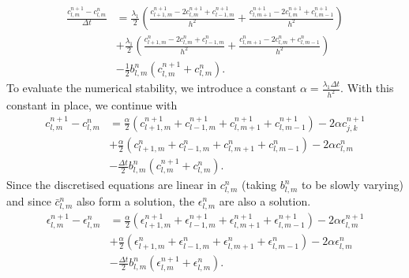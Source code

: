 \begin{equation*}
    \begin{split}
        \frac{c_{l,m}^{n+1} - c_{l,m}^{n}}{\Delta t} &=
        \frac{\lambda_1}{2}  \left( \frac{c_{l+1,m}^{n+1} - 2 c_{l,m}^{n+1} + c_{l-1,m}^{n+1} }{h^2} + 
                                    \frac{c_{l,m+1}^{n+1} - 2 c_{l,m}^{n+1} + c_{l,m-1}^{n+1} }{h^2} \right)  \\
                                   & +\frac{\lambda_1}{2} \left( \frac{c_{l+1,m}^{n} - 2 c_{l,m}^{n} + c_{l-1,m}^{n} }{h^2} + 
                                    \frac{c_{l,m+1}^{n} - 2 c_{l,m}^{n} + c_{l,m-1}^{n} }{h^2} \right) \\
                                   &-\frac{1}{2} b_{l,m}^{n} (c_{l,m}^{n+1} + c_{l,m}^{n}).
    \end{split}
\end{equation*}
To evaluate the numerical stability, we introduce a constant $\alpha = \frac{ \lambda_1 \Delta t }{h^2}$.
With this constant in place, we continue with
\begin{equation*}
    \begin{split}
        c_{l,m}^{n+1} - c_{l,m}^{n} &=
       \frac{\alpha}{2}  \left( c_{l+1,m}^{n+1} + c_{l-1,m}^{n+1} + 
                       c_{l,m+1}^{n+1} + c_{l,m-1}^{n+1}  \right) - 2 \alpha c_{j,k}^{n+1}  \\
                                   & +\frac{\alpha}{2} \left( c_{l+1,m}^{n}+ c_{l-1,m}^{n} + 
                                    c_{l,m+1}^{n} + c_{l,m-1}^{n}  \right) - 2 \alpha c_{l,m}^{n} \\
                                   &-\frac{\Delta t}{2} b_{l,m}^{n} (c_{l,m}^{n+1} + c_{l,m}^{n}).
    \end{split}
\end{equation*}
Since the discretised equations are linear in $c_{l,m}^{n}$ (taking $b_{l,m}^{n}$ to be slowly varying)
and since $\bar{c}_{l,m}^n$ also form a solution, the $\epsilon_{l,m}^n$ are also 
a solution.
\begin{equation*}
    \begin{split}
        \epsilon_{l,m}^{n+1} - \epsilon_{l,m}^{n} &=
       \frac{\alpha}{2}  \left( \epsilon_{l+1,m}^{n+1} + \epsilon_{l-1,m}^{n+1} + 
                                \epsilon_{l,m+1}^{n+1} + \epsilon_{l,m-1}^{n+1}  \right) - 2 \alpha \epsilon_{l,m}^{n+1}  \\
                                   & +\frac{\alpha}{2} \left( \epsilon_{l+1,m}^{n}+ \epsilon_{l-1,m}^{n} + 
                                   \epsilon_{l,m+1}^{n} + \epsilon_{l,m-1}^{n}  \right) - 2 \alpha \epsilon_{l,m}^{n} \\
                                   &-\frac{\Delta t}{2} b_{l,m}^{n} (\epsilon_{l,m}^{n+1} + \epsilon_{l,m}^{n}).
    \end{split}
\end{equation*}

